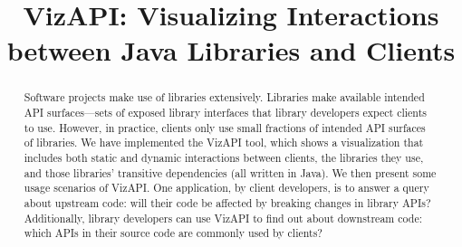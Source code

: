 \documentclass[conference]{IEEEtran}
\begin{document}
\title{VizAPI: Visualizing Interactions between Java Libraries and Clients}



\author{
}
\maketitle

\begin{abstract}
Software projects make use of libraries extensively. Libraries make available intended API surfaces—sets of exposed library interfaces that library developers expect clients to use. However, in practice, clients only use small fractions of intended API surfaces of libraries. We have implemented the VizAPI tool, which shows a visualization that includes both static and dynamic interactions between clients, the libraries they use, and  those libraries’ transitive dependencies (all written in Java). We then present some usage scenarios of VizAPI. One application, by client developers, is to answer a query about upstream code: will their code be affected by breaking changes in library APIs? Additionally, library developers can use VizAPI to find out about downstream code: which APIs in their source code are commonly used by clients? 
\end{abstract}
\end{document}

